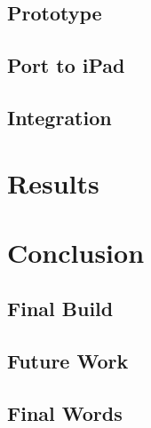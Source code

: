 \documentclass{article}
\begin{document}
\subsection{Prototype}

\subsection{Port to iPad}

\subsection{Integration}


\section{Results}


\section{Conclusion}

\subsection{Final Build}

\subsection{Future Work}

\subsection{Final Words}




\clearpage



\end{document}
